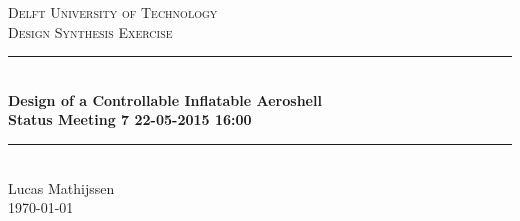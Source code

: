 \documentclass[12pt]{report}
\newcommand{\HRule}{\rule{\linewidth}{0.04cm}}
\begin{document}
\clearpage
\thispagestyle{empty}

\begin{center}

\textsc{\LARGE Delft University of Technology}\\[0.3cm]
\textsc{\Large Design Synthesis Exercise}\\[0.5cm]

\HRule \\[0.4cm]
{\Large \bfseries Design of a Controllable Inflatable Aeroshell}\\[0.2cm]
{\Huge \bfseries Status Meeting 7 22-05-2015 16:00}\\[0.2cm]
\HRule \\[1.2cm]

\vspace{10mm}
Lucas Mathijssen
\\
\today
\\


\end{center}



\newpage

\end{document}
